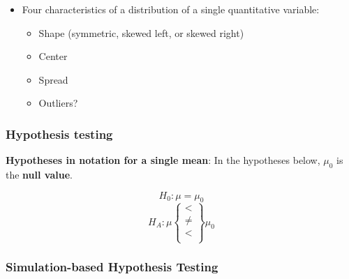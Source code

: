 \documentclass[
]{report}
\newenvironment{Shaded}{\begin{snugshade}}{\end{snugshade}}
\newcommand{\AttributeTok}[1]{\textcolor[rgb]{0.13,0.29,0.53}{#1}}
\newcommand{\CommentTok}[1]{\textcolor[rgb]{0.56,0.35,0.01}{\textit{#1}}}
\newcommand{\FunctionTok}[1]{\textcolor[rgb]{0.13,0.29,0.53}{\textbf{#1}}}
\newcommand{\NormalTok}[1]{#1}
\newcommand{\SpecialCharTok}[1]{\textcolor[rgb]{0.81,0.36,0.00}{\textbf{#1}}}
\newcommand{\StringTok}[1]{\textcolor[rgb]{0.31,0.60,0.02}{#1}}
\begin{document}
\begin{itemize}
\begin{Shaded}
\begin{Highlighting}[]
\NormalTok{object }\SpecialCharTok{\%\textgreater{}\%} \CommentTok{\# Data set piped into...}
    \FunctionTok{ggplot}\NormalTok{(}\FunctionTok{aes}\NormalTok{(}\AttributeTok{x =}\NormalTok{ variable)) }\SpecialCharTok{+} \CommentTok{\# Name variable to plot}
    \FunctionTok{geom\_dotplot}\NormalTok{() }\SpecialCharTok{+} \CommentTok{\# Create dotplot }
    \FunctionTok{labs}\NormalTok{(}\AttributeTok{title =} \StringTok{"Don\textquotesingle{}t forget to title the plot!"}\NormalTok{, }\CommentTok{\# Title for plot}
        \AttributeTok{x =} \StringTok{"x{-}axis label"}\NormalTok{, }\CommentTok{\# Label for x axis}
        \AttributeTok{y =} \StringTok{"y{-}axis label"}\NormalTok{) }\CommentTok{\# Label for y axis}
\end{Highlighting}
\end{Shaded}
\item
  Four characteristics of a distribution of a single quantitative variable:

  \begin{itemize}
  \item
    Shape (symmetric, skewed left, or skewed right)
  \item
    Center
  \item
    Spread
  \item
    Outliers?
  \end{itemize}
\end{itemize}

\subsubsection*{Hypothesis testing}\label{hypothesis-testing-2}

\textbf{Hypotheses in notation for a single mean}: In the hypotheses below, \(\mu_0\) is the \textbf{null value}.

\[H_0: \mu = \mu_0\]
\[H_A: \mu\left\{
\begin{array}{ll}
< \\
\ne \\
< \\
\end{array}
\right\}
\mu_0 \]

\subsubsection*{Simulation-based Hypothesis Testing}\label{simulation-based-hypothesis-testing}
\end{document}
